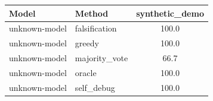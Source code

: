 \begin{tabular}{llc}
\toprule
Model & Method & synthetic_demo \\
\midrule
unknown-model & falsification & 100.0 \\
unknown-model & greedy & 100.0 \\
unknown-model & majority_vote & 66.7 \\
unknown-model & oracle & 100.0 \\
unknown-model & self_debug & 100.0 \\
\bottomrule
\end{tabular}
